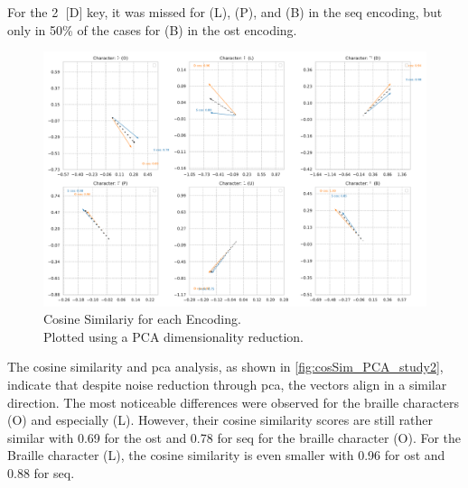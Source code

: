 For the \textcircled{2} [D] key, it was missed for (L), (P), and (B) in the \gls{seq} encoding, but only in 50\% of the cases for (B) in the \gls{ost} encoding.

\begin{figure}
    \centering
    \includegraphics[width=\linewidth]{src/pictures/Study2Data_Experiment/Vectors_study2.pdf}
    \caption{Cosine Similariy for each Encoding.\\Plotted using a PCA dimensionality reduction.}
    \label{fig:cosSim_PCA_study2}
\end{figure}

The cosine similarity and \gls{pca} analysis, as shown in \autoref{fig:cosSim_PCA_study2}, indicate that despite noise reduction through \gls{pca}, the vectors align in a similar direction. The most noticeable differences were observed for the braille characters (O) and especially (L).
However, their cosine similarity scores are still rather similar with 0.69 for the \gls{ost} and 0.78 for \gls{seq} for the braille character (O).
For the Braille character (L), the cosine similarity is even smaller with 0.96 for \gls{ost} and 0.88 for \gls{seq}.
